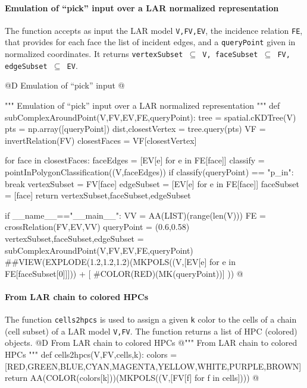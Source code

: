 \documentclass[11pt,oneside]{article}    %
\begin{document}
\paragraph{Emulation of  ``pick'' input over a LAR normalized representation}
The function accepts as input the LAR model \texttt{V,FV,EV}, the incidence relation \texttt{FE}, that provides for each face the list of incident edges, and a \texttt{queryPoint} given in normalized coordinates. It returns \texttt{vertexSubset $\subseteq$ V, faceSubset $\subseteq$ FV, edgeSubset $\subseteq$ EV}.

@D Emulation of ``pick'' input 
@{""" Emulation of  ``pick'' input over a LAR normalized representation """
def subComplexAroundPoint(V,FV,EV,FE,queryPoint):
    tree = spatial.cKDTree(V)
    pts = np.array([queryPoint])
    dist,closestVertex = tree.query(pts)
    VF = invertRelation(FV)
    closestFaces = VF[closestVertex]

    for face in closestFaces:
        faceEdges = [EV[e] for e in FE[face]]
        classify = pointInPolygonClassification((V,faceEdges))
        if classify(queryPoint) == "p_in":
            break
    vertexSubset = FV[face]
    edgeSubset = [EV[e] for e in FE[face]]
    faceSubset = [face]
    return vertexSubset,faceSubset,edgeSubset

if __name__=="__main__":
    VV = AA(LIST)(range(len(V)))
    FE = crossRelation(FV,EV,VV)
    queryPoint = (0.6,0.58)
    vertexSubset,faceSubset,edgeSubset = subComplexAroundPoint(V,FV,EV,FE,queryPoint)
    ##VIEW(EXPLODE(1.2,1.2,1.2)(MKPOLS((V,[EV[e] for e in FE[faceSubset[0]]])) + [
        #COLOR(RED)(MK(queryPoint))] ))
@}



\paragraph{From LAR chain to colored HPCs}
The function \texttt{cells2hpcs} is used to assign a given \texttt{k} color to the cells of a chain (cell subset) of a LAR model \texttt{V,FV}. The function returns a list of HPC (colored) objects.
@D From LAR chain to colored HPCs
@{""" From LAR chain to colored HPCs """
def cells2hpcs(V,FV,cells,k): 
    colors = [RED,GREEN,BLUE,CYAN,MAGENTA,YELLOW,WHITE,PURPLE,BROWN]
    return AA(COLOR(colors[k]))(MKPOLS((V,[FV[f] for f in cells])))
@}
\end{document}
